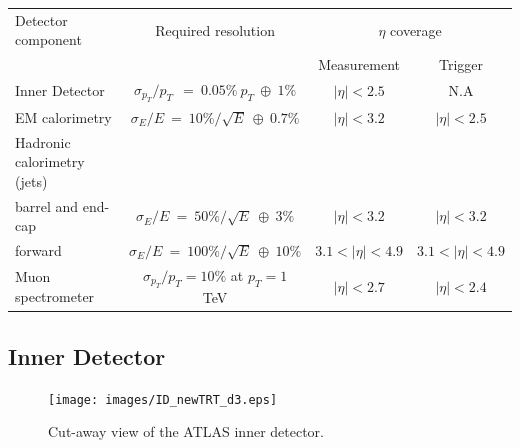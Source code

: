 	\begin{tabular}{ | l | c | c | c | }
		\hline
		Detector component & Required resolution & \multicolumn{2}{|c|}{$\eta$ coverage} \\
		 & & Measurement & Trigger \\
    	\hline
    	\hline
    	Inner Detector & $\sigma_{p_{T}}/p_{T}~~=~0.05\%~p_{T}~\oplus~1\%$ & $|\eta|<2.5$ & N.A \\
    	\hline
    	EM calorimetry & $\sigma_{E}/E~=~10\%/\sqrt{E}~\oplus~0.7\%$ & $|\eta|<3.2$ & $|\eta|<2.5$ \\
    	\hline
    	Hadronic calorimetry (jets) &  &  &  \\
    	  barrel and end-cap & $\sigma_{E}/E~=~50\%/\sqrt{E}~\oplus~3\%$ & $|\eta|<3.2$ & $|\eta|<3.2$ \\
    	  forward  & $\sigma_{E}/E~=~100\%/\sqrt{E}~\oplus~10\%$ & $3.1<|\eta|<4.9$ & $3.1<|\eta|<4.9$ \\
    	\hline
    	Muon spectrometer & $\sigma_{p_{T}}/p_{T} =10\%$ at $p_{T} = 1$ TeV & $|\eta|<2.7$ & $|\eta|<2.4$ \\
    	\hline
  	\end{tabular}





	\subsection{Inner Detector}

		\begin{figure}[h]
			\begin{center}
				\texttt{[image: images/ID\_newTRT\_d3.eps]}
			\end{center}
			\caption{Cut-away view of the ATLAS inner detector.}
			\label{fig:ATLAS_inner}
		\end{figure}

